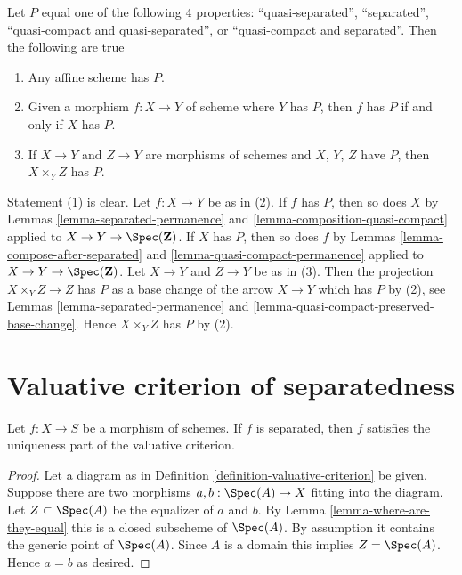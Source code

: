 \begin{remark}
\label{remark-quasi-compact-and-quasi-separated}
Let $P$ equal one of the following $4$ properties:
``quasi-separated'', ``separated'',
``quasi-compact and quasi-separated'', or ``quasi-compact and separated''.
Then the following are true
\begin{enumerate}
\item Any affine scheme has $P$.
\item Given a morphism $f : X \to Y$ of scheme where $Y$ has $P$, then
$f$ has $P$ if and only if $X$ has $P$.
\item If  $X \to Y$ and $Z \to Y$ are morphisms of schemes
and $X$, $Y$, $Z$ have $P$, then $X \times_Y Z$ has $P$.
\end{enumerate}
Statement (1) is clear.
Let $f : X \to Y$ be as in (2). If $f$ has $P$, then so does $X$
by Lemmas \ref{lemma-separated-permanence} and
\ref{lemma-composition-quasi-compact} applied to
$X \to Y \to \Spec(\mathbf{Z})$. If $X$ has $P$, then so does $f$ by
Lemmas \ref{lemma-compose-after-separated} and
\ref{lemma-quasi-compact-permanence} applied to
$X \to Y \to \Spec(\mathbf{Z})$.
Let $X \to Y$ and $Z \to Y$ be as in (3).
Then the projection $X \times_Y Z \to Z$ has $P$ as a base change of
the arrow $X \to Y$ which has $P$ by (2), see Lemmas
\ref{lemma-separated-permanence} and
\ref{lemma-quasi-compact-preserved-base-change}.
Hence $X \times_Y Z$ has $P$ by (2).
\end{remark}





\section{Valuative criterion of separatedness}
\label{section-valuative-separatedness}

\begin{lemma}
\label{lemma-separated-implies-valuative}
Let $f : X \to S$ be a morphism of schemes.
If $f$ is separated, then $f$ satisfies the uniqueness
part of the valuative criterion.
\end{lemma}

\begin{proof}
Let a diagram as in Definition \ref{definition-valuative-criterion}
be given. Suppose there are two morphisms
$a, b : \Spec(A) \to X$ fitting into the diagram.
Let $Z \subset \Spec(A)$ be the equalizer of $a$ and $b$.
By Lemma \ref{lemma-where-are-they-equal} this is a closed
subscheme of $\Spec(A)$. By assumption it contains
the generic point of $\Spec(A)$. Since $A$ is a domain
this implies $Z = \Spec(A)$. Hence $a = b$ as desired.
\end{proof}

